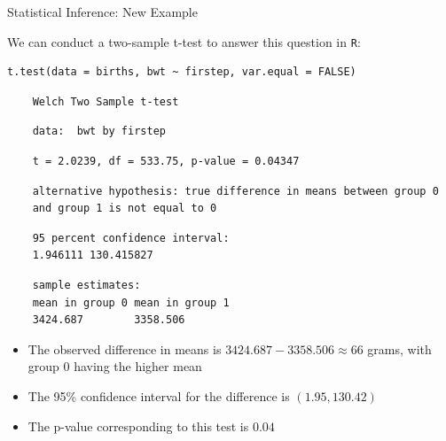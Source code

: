 \documentclass[10pt,t]{beamer}
\begin{document}
\begin{frame}[fragile=singleslide]{Statistical Inference: New Example}
	
	\vspace{-5 mm}
	
	We can conduct a two-sample t-test to answer this question in \texttt{R}:
	
	

\small
\begin{verbatim}t.test(data = births, bwt ~ firstep, var.equal = FALSE)\end{verbatim}
	\smallskip
	
	\begin{verbatim}
	Welch Two Sample t-test
	\end{verbatim}
	\begin{verbatim}
	data:  bwt by firstep
	\end{verbatim}
	\begin{verbatim}
	t = 2.0239, df = 533.75, p-value = 0.04347
	\end{verbatim}
	\begin{verbatim}
	alternative hypothesis: true difference in means between group 0 
	and group 1 is not equal to 0
	\end{verbatim}
	\begin{verbatim}
	95 percent confidence interval:
	1.946111 130.415827
	\end{verbatim}
	\begin{verbatim}
	sample estimates:
	mean in group 0 mean in group 1 
	3424.687        3358.506
	\end{verbatim}

\begin{itemize}
	\item The observed difference in means is $3424.687-  3358.506 \approx 66$ grams, with group $0$ having the higher mean
	\item The 95\% confidence interval for the difference is $(1.95, 130.42)$
	\item The p-value corresponding to this test is $0.04$
\end{itemize}

\end{frame}
\end{document}
